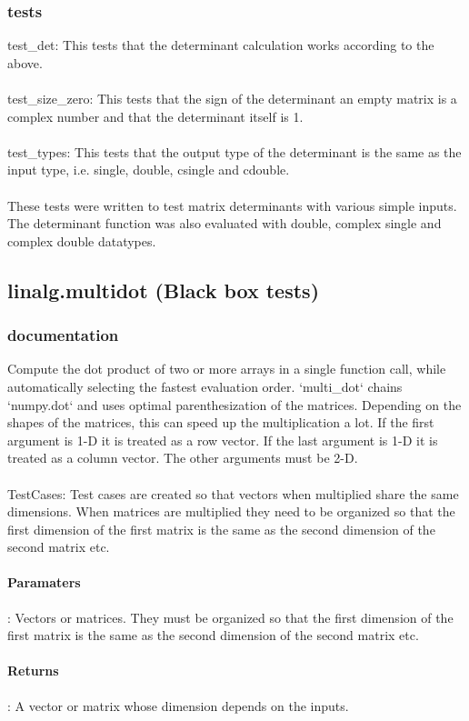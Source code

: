 \documentclass[a4paper,11pt]{article}
\begin{document}
\subsubsection{tests}
test\_det: This tests that the determinant calculation works according to the above. \\
\\
test\_size\_zero: This tests that the sign of the determinant an empty matrix is a complex number and that the determinant itself is 1. \\
\\
test\_types: This tests that the output type of the determinant is the same as the input type, i.e. single, double, csingle and cdouble. \\
\\
These tests were written to test matrix determinants with various simple inputs. The determinant function was also evaluated with double, complex single and complex double datatypes. 

\subsection{linalg.multidot (Black box tests)}
\subsubsection{documentation}
Compute the dot product of two or more arrays in a single function call, while automatically selecting the fastest evaluation order. `multi\_dot` chains `numpy.dot` and uses optimal parenthesization of the matrices. Depending on the shapes of the matrices, this can speed up the multiplication a lot. If the first argument is 1-D it is treated as a row vector. If the last argument is 1-D it is treated as a column vector. The other arguments must be 2-D.\\
\\
TestCases: Test cases are created so that vectors when multiplied share the same dimensions. When matrices are multiplied they need to be organized so that the first dimension of the first matrix is the same as the second dimension of the second matrix etc. 
\paragraph{Paramaters}: Vectors or matrices. They must be organized so that the first dimension of the first matrix is the same as the second dimension of the second matrix etc. 
\paragraph{Returns}: A vector or matrix whose dimension depends on the inputs. 
\end{document}
